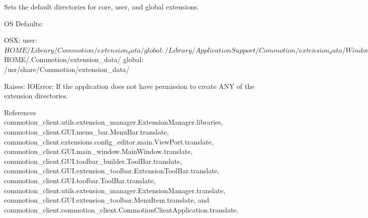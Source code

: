\begin{DoxyVerb}Sets the default directories for core, user, and global extensions.

OS Defaults:

  OSX:
    user: $HOME/Library/Commotion/extension_data/
    global: /Library/Application Support /Commotion/extension_data/

  Windows:
    user: %
    global: %
    The %

  Linux:
    user: $HOME/.Commotion/extension_data/
    global: /usr/share/Commotion/extension_data/

Raises:
  IOError: If the application does not have permission to create ANY of the extension directories.
\end{DoxyVerb}
 

References commotion\-\_\-client.\-utils.\-extension\-\_\-manager.\-Extension\-Manager.\-libraries, commotion\-\_\-client.\-G\-U\-I.\-menu\-\_\-bar.\-Menu\-Bar.\-translate, commotion\-\_\-client.\-extensions.\-config\-\_\-editor.\-main.\-View\-Port.\-translate, commotion\-\_\-client.\-G\-U\-I.\-main\-\_\-window.\-Main\-Window.\-translate, commotion\-\_\-client.\-G\-U\-I.\-toolbar\-\_\-builder.\-Tool\-Bar.\-translate, commotion\-\_\-client.\-G\-U\-I.\-extension\-\_\-toolbar.\-Extension\-Tool\-Bar.\-translate, commotion\-\_\-client.\-G\-U\-I.\-toolbar.\-Tool\-Bar.\-translate, commotion\-\_\-client.\-utils.\-extension\-\_\-manager.\-Extension\-Manager.\-translate, commotion\-\_\-client.\-G\-U\-I.\-extension\-\_\-toolbar.\-Menu\-Item.\-translate, and commotion\-\_\-client.\-commotion\-\_\-client.\-Commotion\-Client\-Application.\-translate.


